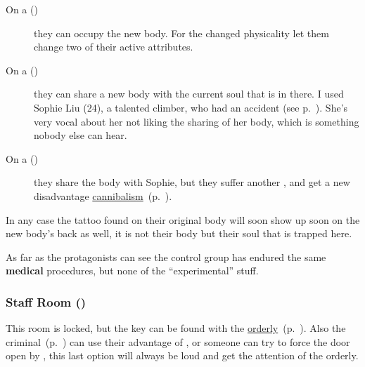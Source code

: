 \begin{description}
  \item[On a ()] they can occupy the new body.  For the changed physicality let them change two of their active
        attributes.
  \item[On a ()] they can share a new body with the current soul that is in there.  I used Sophie Liu (24), a
    talented climber, who had an accident (see p.~\pageref{ssub:other_patients}).  She's very vocal about her not liking the
    sharing of her body, which is something nobody else can hear.
  \item[On a ()] they share the body with Sophie, but they suffer another , and get a new
        disadvantage \hyperref[disadv:cannibalism]{cannibalism}~(p.~\pageref{disadv:cannibalism}).
\end{description}


In any case the tattoo found on their original body will soon show up soon on the new body's back as well, it is not their body
but their soul that is trapped here.


As far as the protagonists can see the control group has endured the same \textbf{medical} procedures, but none of the
“experimental” stuff.

\subsubsection{Staff Room (\faLock)}%
\label{ssub:staff_room}

This room is locked, but the key can be found with the \hyperref[ssub:orderly]{orderly}~(p.~\pageref{ssub:orderly}).  Also the
criminal~(p.~\pageref{sub:the_criminal}) can use their advantage of , or someone can try to force the door open
by , this last option will always be loud and get the attention of the orderly.

